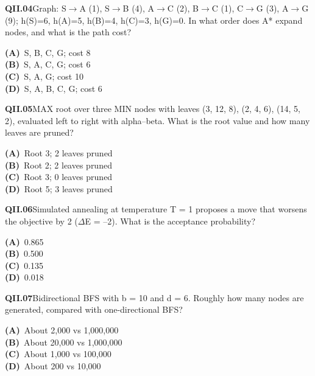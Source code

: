 \begin{tcolorbox}[enhanced,breakable,colback=white,colframe=navyL,arc=2mm,boxrule=0.7pt,left=3mm,right=3mm,top=2mm,bottom=2mm]
\textbf{\color{navy}QII.04}\quad Graph: S$\to$A (1), S$\to$B (4), A$\to$C (2), B$\to$C (1), C$\to$G (3), A$\to$G (9); h(S)=6, h(A)=5, h(B)=4, h(C)=3, h(G)=0. In what order does A* expand nodes, and what is the path cost?\hfill{}\par\smallskip
{\small \textbf{\color{navyL}(A)}\ S, B, C, G; cost 8\\[1pt]\textbf{\color{navyL}(B)}\ S, A, C, G; cost 6\\[1pt]\textbf{\color{navyL}(C)}\ S, A, G; cost 10\\[1pt]\textbf{\color{navyL}(D)}\ S, A, B, C, G; cost 6}
\end{tcolorbox}
\begin{tcolorbox}[enhanced,breakable,colback=white,colframe=navyL,arc=2mm,boxrule=0.7pt,left=3mm,right=3mm,top=2mm,bottom=2mm]
\textbf{\color{navy}QII.05}\quad MAX root over three MIN nodes with leaves (3, 12, 8), (2, 4, 6), (14, 5, 2), evaluated left to right with alpha--beta. What is the root value and how many leaves are pruned?\hfill{}\par\smallskip
{\small \textbf{\color{navyL}(A)}\ Root 3; 2 leaves pruned\\[1pt]\textbf{\color{navyL}(B)}\ Root 2; 2 leaves pruned\\[1pt]\textbf{\color{navyL}(C)}\ Root 3; 0 leaves pruned\\[1pt]\textbf{\color{navyL}(D)}\ Root 5; 3 leaves pruned}
\end{tcolorbox}
\begin{tcolorbox}[enhanced,breakable,colback=white,colframe=navyL,arc=2mm,boxrule=0.7pt,left=3mm,right=3mm,top=2mm,bottom=2mm]
\textbf{\color{navy}QII.06}\quad Simulated annealing at temperature T = 1 proposes a move that worsens the objective by 2 ($\Delta$E = --2). What is the acceptance probability?\hfill{}\par\smallskip
{\small \textbf{\color{navyL}(A)}\ 0.865\\[1pt]\textbf{\color{navyL}(B)}\ 0.500\\[1pt]\textbf{\color{navyL}(C)}\ 0.135\\[1pt]\textbf{\color{navyL}(D)}\ 0.018}
\end{tcolorbox}
\begin{tcolorbox}[enhanced,breakable,colback=white,colframe=navyL,arc=2mm,boxrule=0.7pt,left=3mm,right=3mm,top=2mm,bottom=2mm]
\textbf{\color{navy}QII.07}\quad Bidirectional BFS with b = 10 and d = 6. Roughly how many nodes are generated, compared with one-directional BFS?\hfill{}\par\smallskip
{\small \textbf{\color{navyL}(A)}\ About 2,000 vs 1,000,000\\[1pt]\textbf{\color{navyL}(B)}\ About 20,000 vs 1,000,000\\[1pt]\textbf{\color{navyL}(C)}\ About 1,000 vs 100,000\\[1pt]\textbf{\color{navyL}(D)}\ About 200 vs 10,000}
\end{tcolorbox}
